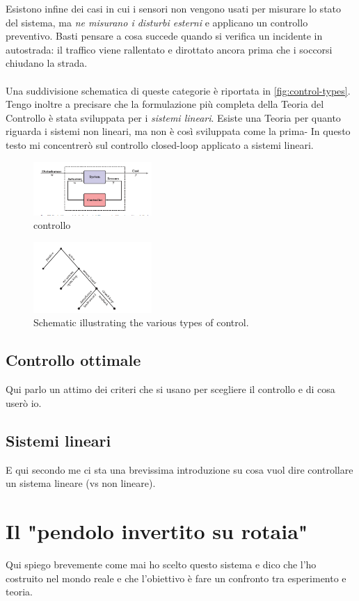 Esistono infine dei casi in cui i sensori non vengono usati per misurare
lo stato del sistema, ma \emph{ne misurano i disturbi esterni} e applicano un
controllo preventivo. Basti pensare a cosa succede quando si verifica un incidente
in autostrada: il traffico viene rallentato e dirottato ancora prima che i soccorsi
chiudano la strada.

\paragraph{}
Una suddivisione schematica di queste categorie è riportata in \autoref{fig:control-types}.
Tengo inoltre a precisare che la formulazione più completa della Teoria del Controllo
è stata sviluppata per i \emph{sistemi lineari}. Esiste una Teoria per quanto riguarda
i sistemi non lineari, ma non è così sviluppata come la prima-
In questo testo mi concentrerò sul controllo closed-loop applicato a sistemi lineari.

\begin{figure}[thb]
    \centering
    \includegraphics[width=0.4\textwidth]{assets/open-vs-closed.png}
    \caption{controllo }%
    \label{fig:open-vs-closed}
\end{figure}


\begin{figure}[thb]
    \centering
    \includegraphics[width=0.4\textwidth]{assets/control-types.png}
    \caption{Schematic illustrating the various types of control.} %
    \label{fig:control-types}
\end{figure}

\subsection{Controllo ottimale}
\label{subsec:controllo-ottimale}
Qui parlo un attimo dei criteri che si usano per scegliere il controllo e di
cosa userò io.

\subsection{Sistemi lineari}
E qui secondo me ci sta una brevissima introduzione su cosa vuol dire
controllare un sistema lineare (vs non lineare).

\section{Il "pendolo invertito su rotaia"}
Qui spiego brevemente come mai ho scelto questo sistema e dico che l'ho costruito nel mondo reale  e che l'obiettivo è fare un confronto tra esperimento e teoria.